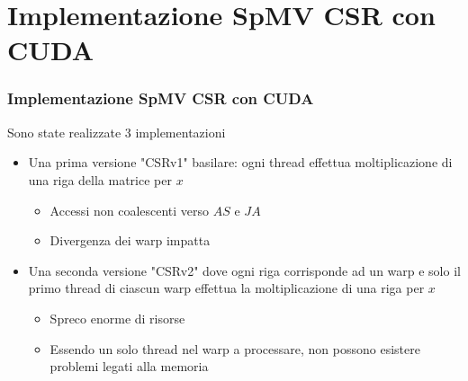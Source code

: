 \documentclass{beamer}
\begin{document}
\section{Implementazione SpMV CSR con CUDA}
\begin{frame}
    \frametitle{Implementazione SpMV CSR con CUDA}
    
    Sono state realizzate 3 implementazioni
    
    \begin{itemize}
    	\item Una prima versione "CSRv1" basilare: ogni thread effettua moltiplicazione
    	di una riga della matrice per $x$
    	\begin{itemize}
    		\item Accessi non coalescenti verso $AS$ e $JA$
    		\item Divergenza dei warp impatta
    	\end{itemize}
    	
    	\item Una seconda versione "CSRv2" dove ogni riga corrisponde ad un warp e solo il primo
    	thread di ciascun warp effettua la moltiplicazione di una riga per $x$
    	\begin{itemize}
    		\item Spreco enorme di risorse
    		\item Essendo un solo thread nel warp a processare,
    		non possono esistere problemi legati alla memoria 
    	\end{itemize}
    \end{itemize}
\end{frame}
\end{document}
